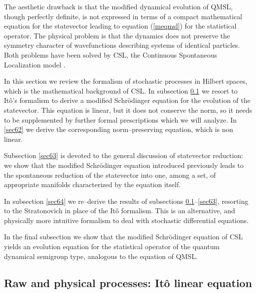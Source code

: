 \documentclass[12pt]{article}
\begin{document}
The aesthetic drawback is that the modified dynamical evolution of
QMSL, though perfectly definite, is not expressed in terms of a
compact mathematical equation for the statevector leading to
equation (\ref{meqmsl}) for the statistical operator. The physical
problem is that the dynamics does not preserve the symmetry character of
wavefunctions describing systems of identical particles. Both problems
have been solved by CSL, the Continuous Spontaneous Localization model
\cite{csl0,csl}.

In this section we review the formalism of stochastic processes in
Hilbert spaces, which is the mathematical background of CSL. In
subsection \ref{sec61} we resort to  It\^o's formalism to derive
a modified Schr\"odinger equation for the evolution of the
statevector. This equation is linear, but it does not conserve the
norm, so it needs to be supplemented by further formal
prescriptions which we will analyze. In \ref{sec62} we derive the
corresponding norm--preserving equation, which is non linear.

Subsection \ref{sec63} is devoted to the general discussion of
statevector reduction: we show that the modified Schr\"odinger
equation introduced previously leads to the spontaneous reduction
of the statevector into one, among a set, of appropriate manifolds
characterized by the equation itself.

In subsection \ref{sec64} we re--derive the results of subsections
\ref{sec61}--\ref{sec63}, resorting to the Stratonovich in place
of the It\^o formalism. This is an alternative, and physically
more intuitive formalism to deal with stochastic differential
equations.

In the final subsection we show that the modified Schr\"odinger
equation of CSL yields an evolution equation for the statistical
operator of the quantum dynamical semigroup type, analogous to the
equation of QMSL.


\subsection{Raw and physical processes: It\^o linear equation}
\label{sec61}
\end{document}
